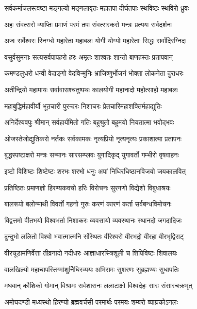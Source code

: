 \twolineshloka
{सर्वकर्माचलस्त्वष्टा मङ्गल्यो मङ्गलावृतः}
{महातपा दीर्घतपाः स्थविष्ठः स्थविरो ध्रुवः}

\twolineshloka
{अहः संवत्सरो व्याप्तिः प्रमाणं परमं तपः}
{संवत्सरकरो मन्त्रः प्रत्ययः सर्वदर्शनः}

\twolineshloka
{अजः सर्वेश्वरः स्निग्धो महारेता महाबलः}
{योगी योग्यो महारेताः सिद्धः सर्वादिरग्निदः}

\twolineshloka
{वसुर्वसुमनाः सत्यसर्वपापहरो हरः}
{अमृतः शाश्वतः शान्तो बाणहस्तः प्रतापवान्}

\twolineshloka
{कमण्डलुधरो धन्वी वेदाङ्गो वेदविन्मुनिः}
{भ्राजिष्णुर्भोजनं भोक्ता लोकनेता दुराधरः}

\twolineshloka
{अतीन्द्रियो महामायः सर्वावासश्चतुष्पथः}
{कालयोगी महानादो महोत्साहो महाबलः}

\twolineshloka
{महाबुद्धिर्महावीर्यो भूतचारी पुरन्दरः}
{निशाचरः प्रेतचारिमहाशक्तिर्महाद्युतिः}

\twolineshloka
{अनिर्देश्यवपुः श्रीमान् सर्वहार्यमितो गतिः}
{बहुश्रुतो बहुमयो नियतात्मा भवोद्भवः}

\twolineshloka
{ओजस्तेजोद्युतिकरो नर्तकः सर्वकामकः}
{नृत्यप्रियो नृत्यनृत्यः प्रकाशात्मा प्रतापनः}

\twolineshloka
{बुद्धस्पष्टाक्षरो मन्त्रः सन्मानः सारसम्प्लवः}
{युगादिकृद् युगावर्तो गम्भीरो वृषवाहनः}

\twolineshloka
{इष्टो विशिष्टः शिष्टेष्टः शरभः शरभो धनुः}
{अपां निधिरधिष्ठानविजयो जयकालवित्}

\twolineshloka
{प्रतिष्ठितः प्रमाणज्ञो हिरण्यकवचो हरिः}
{विरोचनः सुरगणो विद्येशो विबुधाश्रयः}

\twolineshloka
{बालरूपो बलोन्माथी विवर्तो गहनो गुरुः}
{करणं कारणं कर्ता सर्वबन्धविमोचनः}

\twolineshloka
{विद्वत्तमो वीतभयो विश्वभर्ता निशाकरः}
{व्यवसायो व्यवस्थानः स्थानदो जगदादिजः}

\twolineshloka
{दुन्दुभो ललितो विश्वो भवात्मात्मनि संस्थितः}
{वीरेश्वरो वीरभद्रो वीरहा वीरभृद्विराट्}

\twolineshloka
{वीरचूडामणिर्वेत्ता तीव्रनादो नदीधरः}
{आज्ञाधारस्त्रिशूली च शिपिविष्टः शिवालयः}

\twolineshloka
{वालखिल्यो महाचापस्तिग्मांशुर्निधिरव्ययः}
{अभिरामः सुशरणः सुब्रह्मण्यः सुधापतिः}

\twolineshloka
{मघवान् कौशिको गोमान् विश्रामः सर्वशासनः}
{ललाटाक्षो विश्वदेहः सारः संसारचक्रभृत्}

\twolineshloka
{अमोघदण्डी मध्यस्थो हिरण्यो ब्रह्मवर्चसी}
{परमार्थः परमयः शम्बरो व्याघ्रकोऽनलः}

